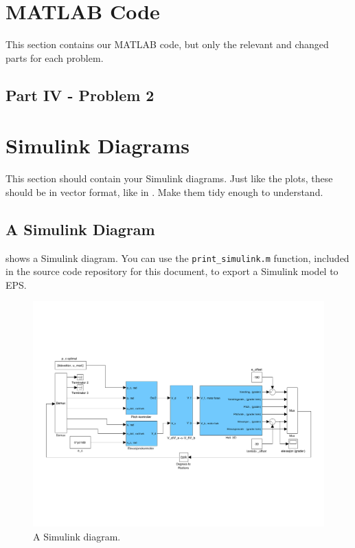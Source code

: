 \appendix

\section{MATLAB Code}\label{sec:matlab}
This section contains our MATLAB code, but only the relevant and changed parts for each problem. 

\subsection{Part IV - Problem 2}\label{subsec:P4p2_init.m}


\section{Simulink Diagrams}\label{sec:simulink}
This section should contain your Simulink diagrams. Just like the plots, these should be in vector format, like in . Make them tidy enough to understand.

\subsection{A Simulink Diagram}
 shows a Simulink diagram. You can use the \texttt{print\_simulink.m} function, included in the source code repository for this document, to export a Simulink model to EPS\@.
\begin{figure}[htb]
	\centering
		\includegraphics[width = \textwidth]{figures/simulink_fra_mal.pdf}
	\caption{A Simulink diagram.}
\label{fig:simulink}
\end{figure}
